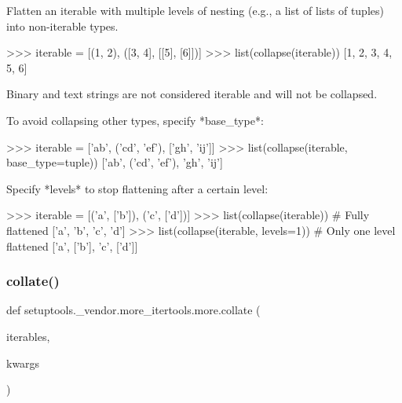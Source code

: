 \begin{DoxyVerb}Flatten an iterable with multiple levels of nesting (e.g., a list of
lists of tuples) into non-iterable types.

    >>> iterable = [(1, 2), ([3, 4], [[5], [6]])]
    >>> list(collapse(iterable))
    [1, 2, 3, 4, 5, 6]

Binary and text strings are not considered iterable and
will not be collapsed.

To avoid collapsing other types, specify *base_type*:

    >>> iterable = ['ab', ('cd', 'ef'), ['gh', 'ij']]
    >>> list(collapse(iterable, base_type=tuple))
    ['ab', ('cd', 'ef'), 'gh', 'ij']

Specify *levels* to stop flattening after a certain level:

>>> iterable = [('a', ['b']), ('c', ['d'])]
>>> list(collapse(iterable))  # Fully flattened
['a', 'b', 'c', 'd']
>>> list(collapse(iterable, levels=1))  # Only one level flattened
['a', ['b'], 'c', ['d']]\end{DoxyVerb}
 \mbox{\label{namespacesetuptools_1_1__vendor_1_1more__itertools_1_1more_a7704c89f2e7f53903f060c465dbae459}} 
\subsubsection{\texorpdfstring{collate()}{collate()}}
{\footnotesize\ttfamily def setuptools.\+\_\+vendor.\+more\+\_\+itertools.\+more.\+collate (\begin{DoxyParamCaption}\item[{}]{iterables,  }\item[{}]{kwargs }\end{DoxyParamCaption})}


